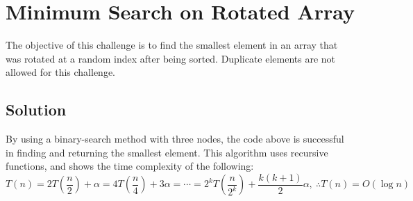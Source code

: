 \chapter{Minimum Search on Rotated Array}
The objective of this challenge is to find the smallest element in an array
that was rotated at a random index after being sorted. Duplicate elements are
not allowed for this challenge.

\section{Solution}

By using a binary-search method with three nodes, the code above is successful
in finding and returning the smallest element. This algorithm uses recursive
functions, and shows the time complexity of the following:
\[ T(n)=2T\left(\frac{n}{2}\right)+\alpha=4T\left(\frac{n}{4}\right)+3\alpha=
\cdots=2^kT\left(\frac{n}{2^k}\right)+\frac{k(k+1)}{2}\alpha,~\therefore T(n)=
O(\log n) \]

\iffalse
\section{With Duplicate Elements}
With duplicate elements, the time complexity cannot be kept at $\log n$. Follow-
up explanations for rotated arrays with duplicates will soon be committed.
\fi
